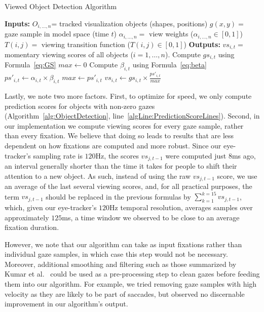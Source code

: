 \begin{algorithm}
\caption{Viewed Object Detection Algorithm}
\label{alg:ObjectDetection}
\begin{algorithmic}[1]
\State \textbf{Inputs: } 
\Statex $O_{i, \ldots, n}$= tracked visualization objects (shapes, positions)
\Statex $g(x,y) = $ gaze sample in model space (time $t$)
\Statex $\alpha_{i, \ldots, n} = $ view weights ($\alpha_{i, \ldots, n} \in [0,1]$)
\Statex $T(i,j) = $ viewing transition function ($T(i,j) \in [0,1]$)
\State \textbf{Outputs:}
\Statex $vs_{i,t} = $ momentary viewing scores of all objects ($i = 1, \ldots, n$). 
	\State Compute $gs_{i,t}$	using Formula~\ref{eq:GS}
\EndFor
\State $max \gets 0$
	 \label{algLine:PredictionScoreLines}
		\State Compute $\beta_{i,t}$	using Formula~\ref{eq:beta}
		\State $ps'_{i,t} \gets \alpha_{i,t} \times \beta_{i,t}$
			\State $max \gets ps'_{i,t}$
		\EndIf
	\EndIf
\EndFor
{}
	\State $vs_{i,t} \gets gs_{i,t} \times \frac{ps'_{i,t}}{max} $
\EndFor
\end{algorithmic}
\end{algorithm}

Lastly, we note two more factors. First, to optimize for speed, we only compute prediction scores for objects with non-zero gazes (Algorithm~\ref{alg:ObjectDetection}, line~\ref{algLine:PredictionScoreLines}). Second, in our implementation we compute viewing scores for every gaze sample, rather than every fixation. We believe that doing so leads to results that are less dependent on how fixations are computed and more robust. Since our eye-tracker's sampling rate is $120$Hz, the scores $vs_{j, t-1}$ were computed just $8$ms ago, an interval generally shorter than the time it takes for people to shift their attention to a new object. As such, instead of using the raw $vs_{j,t-1}$ score, we use an average of the last several viewing scores, and, for all practical purposes, the term $vs_{j,t-1}$ should be replaced in the previous formulas by $ \sum_{k=1}^{k=15}{vs_{j,t-1}}$, which, given our eye-tracker's $120$Hz temporal resolution, averages samples over approximately $125$ms, a time window we observed to be close to an average fixation duration.  

However, we note that our algorithm can take as input fixations rather than individual gaze samples, in which case this step would not be necessary. Moreover, additional smoothing and filtering such as those summarized by Kumar et al.~\cite{kumar2008improving} could be used as a pre-processing step to clean gazes before feeding them into our algorithm. For example, we tried removing gaze samples with high velocity as they are likely to be part of saccades, but observed no discernable improvement in our algorithm's output. 



